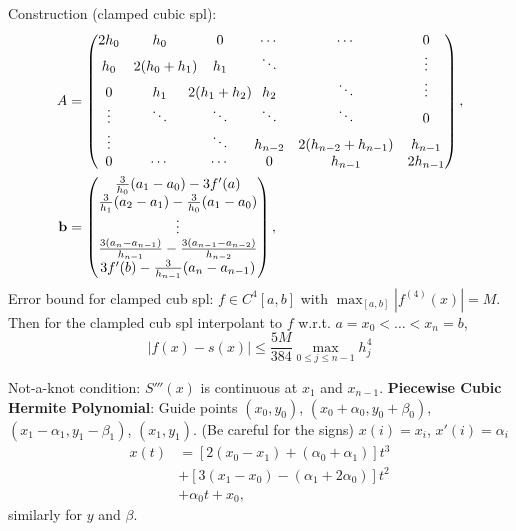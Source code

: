 \documentclass[9pt]{memoir}
\begin{document}
\begin{multicols*}{3}
    \s Construction (clamped cubic spl):
    \begin{align*}
        A         & = \begin{pmatrix}
            2h_0   & h_0                    & 0                                 & \cdots  & \cdots             & 0        \\
            h_0    & 2(h_0+h_1) \mkern-15mu & h_1                               & \ddots  &                    & \vdots   \\
            0      & h_1                    & \mkern-15mu 2(h_1+h_2)\mkern-15mu & h_2     & \ddots             & \vdots   \\
            \vdots & \ddots                 & \ddots                            & \ddots  & \ddots             & 0        \\
            \vdots &                        & \ddots                            & h_{n-2} & 2(h_{n-2}+h_{n-1}) & h_{n-1}  \\
            0      & \cdots                 & \cdots                            & 0       & h_{n-1}            & 2h_{n-1} \\
        \end{pmatrix}, \\
        \mathbf b & = \begin{pmatrix}
            \frac 3{h_0}(a_1-a_0)-3f'(a) \\ \frac 3{h_1}(a_2-a_1)-\frac 3{h_0}(a_1-a_0) \\ \vdots \\ \frac {3(a_n-a_{n-1})}{h_{n-1}}-\frac {3(a_{n-1}-a_{n-2})}{h_{n-2}} \\ 3f'(b) - \frac 3{h_{n-1}}(a_n-a_{n-1})
        \end{pmatrix},
    \end{align*}
    \s Error bound for clamped cub spl: \nl
    $f \in C^4[a,b]$ with $\max_{[a,b]}|f^{(4)}(x)| = M$. Then for the clampled cub spl interpolant to $f$ w.r.t. $a=x_0<\dots <x_n=b$,
    $$ |f(x)-s(x)| \le \frac{5M}{384}\max_{0\le j\le n-1} h_j^4 $$

    \s Not-a-knot condition: $S'''(x)$ is continuous at $x_1$ and $x_{n-1}$.\nl
    \s \textbf{Piecewise Cubic Hermite Polynomial}: Guide points
    $(x_0,y_0)$, $(x_0+\alpha_0,y_0+\beta_0)$, \uline{$(x_1-\alpha_1,y_1-\beta_1)$}, $(x_1,y_1)$. (Be careful for the signs) \nl
    $x(i)=x_i$, $x'(i)=\alpha_i$
    \begin{align*}
        x(t) & = [2(x_0-x_1)+(\alpha_0+\alpha_1)]t^3
        \\&+ [3(x_1-x_0)-(\alpha_1+2\alpha_0)]t^2
        \\&+\alpha_0 t + x_0,
    \end{align*}
    similarly for $y$ and $\beta$.


\end{multicols*}
\end{document}
